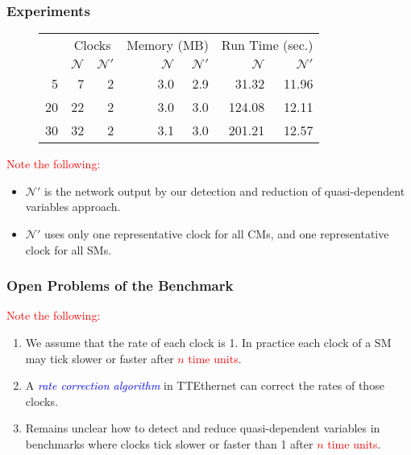 \documentclass[serif]{beamer}
\begin{document}
\begin{frame}\frametitle{\textbf{Experiments}}
\begin{center}
\begin{figure} 
\begin{table}[t]%
  \centering
  \begin{tabular}[b]{|r||r|r||r|r||r|r|}
    \hline
    \multirow{2}{*}{} &
    \multicolumn{2}{|c||}{\scriptsize Clocks}  & 
    \multicolumn{2}{|c||}{\scriptsize Memory (MB)}  & 
    \multicolumn{2}{|c|}{\scriptsize Run Time (sec.)} 
    \\ 
    \scriptsize Components
    &\scriptsize $\mathcal{N}$ &\scriptsize $\mathcal{N}'$  
    &\scriptsize $\mathcal{N}$ &\scriptsize $\mathcal{N}'$  
    &\scriptsize $\mathcal{N}$ &\scriptsize $\mathcal{N}'$ 
    \\    \hline\hline 
    \scriptsize 5 & \scriptsize 7 & \scriptsize 2 &\scriptsize \textcolor{white}{000,}3.0 &\scriptsize 2.9 &\scriptsize 31.32 
    &\scriptsize 11.96
    \\    \hline 
    \scriptsize 20 & \scriptsize 22 & \scriptsize 2 &\scriptsize 3.0&\scriptsize 3.0 &\scriptsize 124.08&\scriptsize 12.11
    \\    \hline 
    \scriptsize 30 & \scriptsize 32 &\scriptsize 2 &\scriptsize 3.1 &\scriptsize 3.0 &\scriptsize 201.21 &\scriptsize 12.57
    \\    \hline 
  \end{tabular}
\end{table}%
\end{figure} 
\end{center}

\textcolor{red}{Note the following:} 
\begin{itemize}
	\item $\mathcal{N}'$ is the network output by our detection and reduction of quasi-dependent variables approach.
	\item $\mathcal{N}'$ uses only one representative clock for all CMs, and one representative clock for all SMs.
\end{itemize}  
\end{frame}
 
\begin{frame}\frametitle{\textbf{Open Problems of the Benchmark}}
\textcolor{red}{Note the following:}  
\begin{enumerate}
\item We assume that the rate of each clock is 1. In practice each clock of a SM 
			may tick slower or faster after \textcolor{red}{$n$ time units}.
\item A \emph{\textcolor{blue}{rate correction algorithm}} in TTEthernet can correct the rates of those clocks.
\item Remains unclear how to detect and reduce quasi-dependent variables in
			benchmarks where clocks tick slower or faster than 1 after \textcolor{red}{$n$ time units}. 
\end{enumerate}
\end{frame}

\begin{frame}\frametitle{}
\end{frame}
\end{document}
